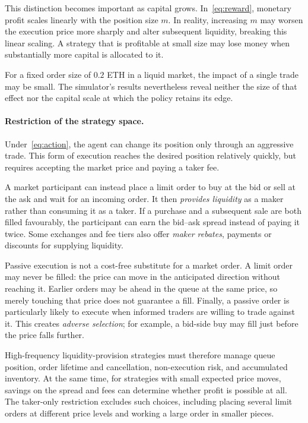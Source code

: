 \documentclass[9pt,a4paper,twocolumn]{extarticle}
\begin{document}
This distinction becomes important as capital grows. In~\eqref{eq:reward}, monetary profit scales
linearly with the position size $m$. In reality, increasing $m$ may worsen the execution price
more sharply and alter subsequent liquidity, breaking this linear scaling. A strategy that is
profitable at small size may lose money when substantially more capital is allocated to it.

For a fixed order size of $0.2$ ETH in a liquid market, the impact of a single trade may be
small. The simulator's results nevertheless reveal neither the size of that effect nor the
capital scale at which the policy retains its edge.

\paragraph{Restriction of the strategy space.}

Under~\eqref{eq:action}, the agent can change its position only through an aggressive trade. This
form of execution reaches the desired position relatively quickly, but requires accepting the
market price and paying a taker fee.

A market participant can instead place a limit order to buy at the bid or sell at the ask and
wait for an incoming order. It then \emph{provides liquidity} as a maker rather than consuming it
as a taker. If a purchase and a subsequent sale are both filled favourably, the participant can
earn the bid--ask spread instead of paying it twice. Some exchanges and fee tiers also offer
\emph{maker rebates}, payments or discounts for supplying liquidity.

Passive execution is not a cost-free substitute for a market order. A limit order may never be
filled: the price can move in the anticipated direction without reaching it. Earlier orders may
be ahead in the queue at the same price, so merely touching that price does not guarantee a
fill. Finally, a passive order is particularly likely to execute when informed traders are
willing to trade against it. This creates \emph{adverse selection}; for example, a bid-side buy
may fill just before the price falls further.

High-frequency liquidity-provision strategies must therefore manage queue position, order
lifetime and cancellation, non-execution risk, and accumulated inventory. At the same time, for
strategies with small expected price moves, savings on the spread and fees can determine whether
profit is possible at all. The taker-only restriction excludes such choices, including placing
several limit orders at different price levels and working a large order in smaller pieces.
\end{document}
